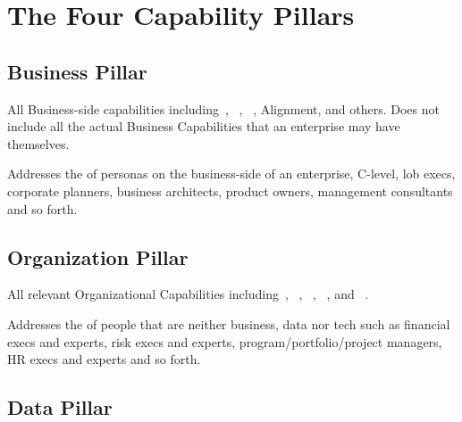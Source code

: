 \section{The Four Capability Pillars}\label{sec:ekg-mm-the-four-pillars}


\subsection{Business Pillar}\label{subsec:ekg-mm-the-four-pillars-business-pillar}

All Business-side capabilities including~,
~,
~, Alignment,
 and others.
Does not include all the actual Business Capabilities that
an enterprise may have themselves.

Addresses the  of personas on the business-side of an enterprise, C-level,
\gls{lob} execs,
corporate planners,
business architects, product owners,
management consultants and so forth.

\subsection{Organization Pillar}\label{subsec:ekg-mm-the-four-pillars-organization-pillar}

All relevant Organizational Capabilities including~,
~,
~,
~, and
~.

Addresses the  of people that are neither business, data nor tech such as financial execs and experts, risk
execs and experts, program/portfolio/project managers, HR execs and experts and so forth.

\subsection{Data Pillar}\label{subsec:ekg-mm-the-four-pillars-data-pillar}

